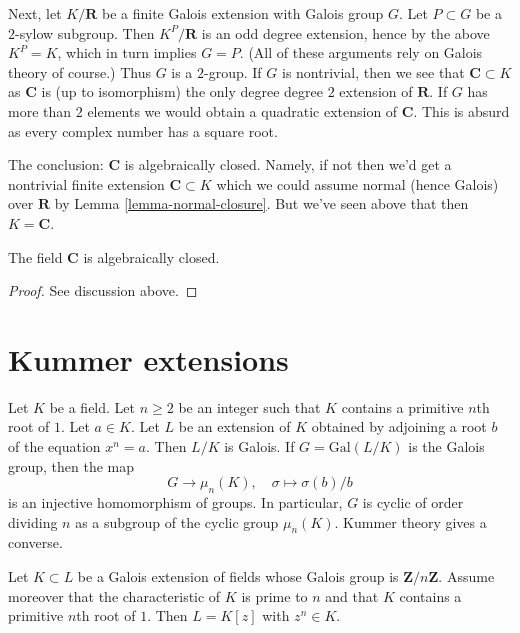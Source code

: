 \medskip\noindent
Next, let $K/\mathbf{R}$ be a finite Galois extension with Galois group $G$.
Let $P \subset G$ be a $2$-sylow subgroup. Then $K^P/\mathbf{R}$ is an
odd degree extension, hence by the above $K^P = K$, which in turn implies
$G = P$. (All of these arguments rely on Galois theory of course.)
Thus $G$ is a $2$-group. If $G$ is nontrivial, then we see that
$\mathbf{C} \subset K$ as $\mathbf{C}$ is (up to isomorphism) the only degree
degree $2$ extension of $\mathbf{R}$. If $G$ has more than $2$ elements
we would obtain a quadratic extension of $\mathbf{C}$.
This is absurd as every complex number has a square root.

\medskip\noindent
The conclusion: $\mathbf{C}$ is algebraically closed. Namely, if not
then we'd get a nontrivial finite extension $\mathbf{C} \subset K$
which we could assume normal (hence Galois) over $\mathbf{R}$ by
Lemma \ref{lemma-normal-closure}. But we've seen above that then
$K = \mathbf{C}$.

\begin{lemma}
\label{lemma-C-algebraically-closed}
The field $\mathbf{C}$ is algebraically closed.
\end{lemma}

\begin{proof}
See discussion above.
\end{proof}





\section{Kummer extensions}
\label{section-Kummer}

\noindent
Let $K$ be a field. Let $n \geq 2$ be an integer such that $K$ contains
a primitive $n$th root of $1$. Let $a \in K$. Let $L$ be an extension
of $K$ obtained by adjoining a root $b$ of the equation $x^n = a$.
Then $L/K$ is Galois. If $G = \text{Gal}(L/K)$ is the Galois group, then
the map
$$
G \longrightarrow \mu_n(K),\quad \sigma \longmapsto \sigma(b)/b
$$
is an injective homomorphism of groups. In particular, $G$ is cyclic
of order dividing $n$ as a subgroup of the cyclic group $\mu_n(K)$.
Kummer theory gives a converse.

\begin{lemma}
\label{lemma-Kummer}
Let $K \subset L$ be a Galois extension of fields whose Galois group is
$\mathbf{Z}/n\mathbf{Z}$. Assume moreover that the characteristic of $K$
is prime to $n$ and that $K$ contains a primitive $n$th root of $1$.
Then $L = K[z]$ with $z^n \in K$.
\end{lemma}

